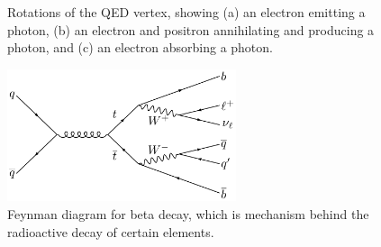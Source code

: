 \begin{figure}[htb]
    \centering
    \quad
    \quad
    \caption{
        Rotations of the QED vertex, showing (a) an electron emitting a photon, (b) an electron and positron annihilating and producing a photon, and (c) an electron absorbing a photon. 
    }
    \label{fig:qed_rotations}
\end{figure}

\begin{figure}[htb]
    \centering
    \includegraphics[width=0.6\textwidth]{fig/feynman/ttbar/ttbar_onelep.pdf} %
    \caption{
        Feynman diagram for beta decay, which is mechanism behind the radioactive decay of certain elements. 
    }
    \label{fig:beta_decay}
\end{figure}

